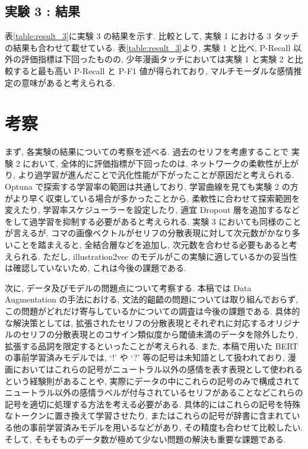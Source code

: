 \documentclass[twocolumn]{jarticle}     %
\begin{document}
\subsection{実験 3 : 結果}
表\ref{table:result_3}に実験 3 の結果を示す. 比較として, 実験 1 における 3 タッチの結果も合わせて載せている.
表\ref{table:result_3}より, 実験 1 と比べ, P-Recall 以外の評価指標は下回ったものの, 少年漫画タッチにおいては実験 1 と実験 2 と比較すると最も高い P-Recall と P-F1 値が得られており, マルチモーダルな感情推定の意味があると考えられる.


\section{考察}
まず, 各実験の結果についての考察を述べる. 過去のセリフを考慮することで 実験 2 において, 全体的に評価指標が下回ったのは, ネットワークの柔軟性が上がり, より過学習が進んだことで汎化性能が下がったことが原因だと考えられる. Optuna で探索する学習率の範囲は共通しており, 学習曲線を見ても実験 2 の方がより早く収束している場合が多かったことから, 柔軟性に合わせて探索範囲を変えたり, 学習率スケジューラーを設定したり, 適宜 Dropout 層を追加するなどをして過学習を抑制する必要があると考えられる. 実験 3 においても同様のことが言えるが, コマの画像ベクトルがセリフの分散表現に対して次元数がかなり多いことを踏まえると, 全結合層などを追加し, 次元数を合わせる必要もあると考えられる. ただし, illustration2vec のモデルがこの実験に適しているかの妥当性は確認していないため, これは今後の課題である.

次に, データ及びモデルの問題点について考察する. 本稿では Data Augmentation の手法における, 文法的齟齬の問題については取り組んでおらず, この問題がどれだけ寄与しているかについての調査は今後の課題である. 具体的な解決策としては, 拡張されたセリフの分散表現とそれぞれに対応するオリジナルのセリフの分散表現とのコサイン類似度から閾値未満のデータを除外したり, 拡張する品詞を限定するといったことが考えられる. また, 本稿で用いた BERT の事前学習済みモデルでは, `!' や `?' 等の記号は未知語として扱われており, 漫画においてはこれらの記号がニュートラル以外の感情を表す表現として使われるという経験則があることや, 実際にデータの中にこれらの記号のみで構成されてニュートラル以外の感情ラベルが付与されているセリフがあることなどこれらの記号を適切に処理する方法を考える必要がある. 具体的にはこれらの記号を特殊なトークンに置き換えて学習させたり, またはこれらの記号が辞書に含まれている他の事前学習済みモデルを用いるなどがあり, その精度も合わせて比較したい. そして, そもそものデータ数が極めて少ない問題の解決も重要な課題である.
\end{document}
